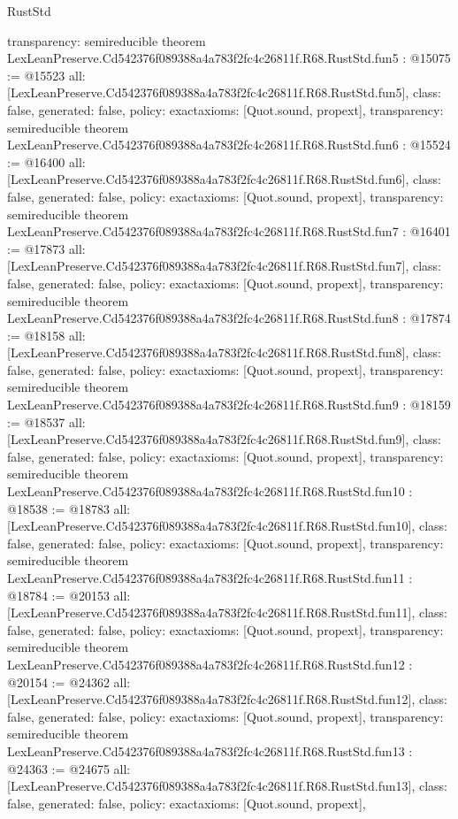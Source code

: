 \begin{lexlean}{RustStd}
\begin{coremodule}
{  transparency: semireducible
}
theorem LexLeanPreserve.Cd542376f089388a4a783f2fc4c26811f.R68.RustStd.fun5 : @15075 := @15523 {
  all: [LexLeanPreserve.Cd542376f089388a4a783f2fc4c26811f.R68.RustStd.fun5],
  class: false,
  generated: false,
  policy: exact{axioms: [Quot.sound, propext]},
  transparency: semireducible
}
theorem LexLeanPreserve.Cd542376f089388a4a783f2fc4c26811f.R68.RustStd.fun6 : @15524 := @16400 {
  all: [LexLeanPreserve.Cd542376f089388a4a783f2fc4c26811f.R68.RustStd.fun6],
  class: false,
  generated: false,
  policy: exact{axioms: [Quot.sound, propext]},
  transparency: semireducible
}
theorem LexLeanPreserve.Cd542376f089388a4a783f2fc4c26811f.R68.RustStd.fun7 : @16401 := @17873 {
  all: [LexLeanPreserve.Cd542376f089388a4a783f2fc4c26811f.R68.RustStd.fun7],
  class: false,
  generated: false,
  policy: exact{axioms: [Quot.sound, propext]},
  transparency: semireducible
}
theorem LexLeanPreserve.Cd542376f089388a4a783f2fc4c26811f.R68.RustStd.fun8 : @17874 := @18158 {
  all: [LexLeanPreserve.Cd542376f089388a4a783f2fc4c26811f.R68.RustStd.fun8],
  class: false,
  generated: false,
  policy: exact{axioms: [Quot.sound, propext]},
  transparency: semireducible
}
theorem LexLeanPreserve.Cd542376f089388a4a783f2fc4c26811f.R68.RustStd.fun9 : @18159 := @18537 {
  all: [LexLeanPreserve.Cd542376f089388a4a783f2fc4c26811f.R68.RustStd.fun9],
  class: false,
  generated: false,
  policy: exact{axioms: [Quot.sound, propext]},
  transparency: semireducible
}
theorem LexLeanPreserve.Cd542376f089388a4a783f2fc4c26811f.R68.RustStd.fun10 : @18538 := @18783 {
  all: [LexLeanPreserve.Cd542376f089388a4a783f2fc4c26811f.R68.RustStd.fun10],
  class: false,
  generated: false,
  policy: exact{axioms: [Quot.sound, propext]},
  transparency: semireducible
}
theorem LexLeanPreserve.Cd542376f089388a4a783f2fc4c26811f.R68.RustStd.fun11 : @18784 := @20153 {
  all: [LexLeanPreserve.Cd542376f089388a4a783f2fc4c26811f.R68.RustStd.fun11],
  class: false,
  generated: false,
  policy: exact{axioms: [Quot.sound, propext]},
  transparency: semireducible
}
theorem LexLeanPreserve.Cd542376f089388a4a783f2fc4c26811f.R68.RustStd.fun12 : @20154 := @24362 {
  all: [LexLeanPreserve.Cd542376f089388a4a783f2fc4c26811f.R68.RustStd.fun12],
  class: false,
  generated: false,
  policy: exact{axioms: [Quot.sound, propext]},
  transparency: semireducible
}
theorem LexLeanPreserve.Cd542376f089388a4a783f2fc4c26811f.R68.RustStd.fun13 : @24363 := @24675 {
  all: [LexLeanPreserve.Cd542376f089388a4a783f2fc4c26811f.R68.RustStd.fun13],
  class: false,
  generated: false,
  policy: exact{axioms: [Quot.sound, propext]},
}
\end{coremodule}
\end{lexlean}
